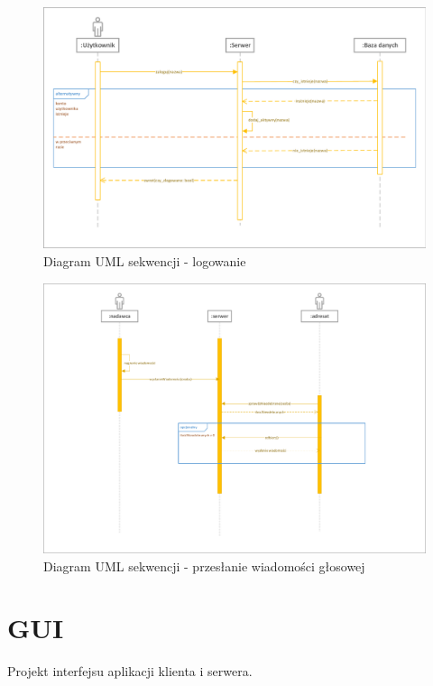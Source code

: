 \documentclass[12pt,a4paper]{article}
\begin{document}
	\begin{figure}[h!]
		\begin{center}
			\includegraphics*[width=.95\textwidth]{UML_sekwencji_logowanie.pdf}
		\end{center}
		\caption{Diagram UML sekwencji - logowanie}
	\end{figure}
	
	\pagebreak
	\begin{figure}[h!]
		\begin{center}
			\includegraphics*[width=.95\textwidth]{UML_sekwencji_nawiazanie_rozmowy.pdf}
		\end{center}
		\caption{Diagram UML sekwencji - przesłanie wiadomości głosowej}
	\end{figure}
	
	\pagebreak
	\section{GUI}
	\par Projekt interfejsu aplikacji klienta i serwera. 
	
\end{document}
